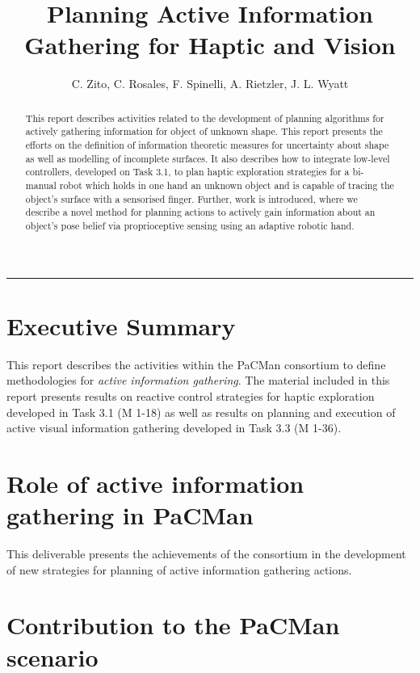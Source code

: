 \documentclass[a4paper,11pt,pdf]{pacmanreport}
\title{Planning Active Information Gathering for Haptic and Vision}
\author{C. Zito, C. Rosales, F. Spinelli, A. Rietzler, J. L. Wyatt}
\begin{document}
\maketitle

\begin{abstract}
\noindent 
This report describes activities related to the development of planning algorithms for actively gathering information for object of unknown shape. 
This report presents the efforts on the definition of information theoretic measures for uncertainty about shape as well as modelling of incomplete surfaces. 
It also describes how to integrate low-level controllers, developed on Task 3.1, to plan haptic exploration strategies for a bi-manual robot which holds in one 
hand an unknown object and is capable of tracing the object's surface with a sensorised finger. 
Further, work is introduced, where we describe a novel method for planning actions to actively gain 
information about an object's pose belief via proprioceptive sensing using an adaptive robotic hand.
\end{abstract}


\vspace{.2em}
\hrule

\footnotesize

\tableofcontents

\normalsize

\newpage

\section*{Executive Summary}

This report describes the activities within the PaCMan consortium to define methodologies for \emph{active information gathering}.
The material included in this report presents results on reactive control strategies for haptic exploration developed in Task 3.1 (M 1-18) 
as well as results on planning and execution of active visual information gathering developed in Task 3.3 (M 1-36).

\section*{Role of active information gathering in PaCMan}

This deliverable presents the achievements of the consortium in the development of new strategies for planning of active information gathering actions. 

\section*{Contribution to the PaCMan scenario}
\end{document}
